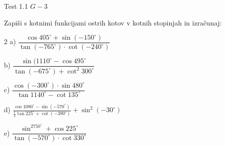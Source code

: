 \documentclass[a4paper,12pt]{letter}
\renewcommand{\headrulewidth}{3pt}
\renewcommand{\headrulewidth}{0.3pt}
\begin{document}
\pagestyle{fancy}
\renewcommand\headrulewidth{0pt}
\lhead{}\chead{}\rhead{}
\rfoot{\vspace*{-2\baselineskip}}


\renewcommand{\vec}{\overrightarrow}


\everymath{\displaystyle}
\begin{minipage}{20cm}
\begin{bclogo}[couleur=brown!30,
  arrondi=0,ombre=true, couleurOmbre=gray!50,
logo =\bcplume,
  noborder=true]
{\textrm{{\Large{Test 1.1} \Huge{}
\large{} \hfill $G-3$}}}
\end{bclogo}
\end{minipage}
\begin{minipage}{20cm}
\begin{bclogo}[couleur=brown!30,
  arrondi=0,ombre=true, couleurOmbre=gray!50,
logo =\bcplume,
  noborder=true]
{\textrm{{}}}
\end{bclogo}
\end{minipage}

\begin{naloga}
Zapiši s kotnimi funkcijami ostrih kotov v kotnih stopinjah in izračunaj:
\begin{multicols}{2}
a) $
\dfrac{\cos 405^\circ + \sin(-150^\circ)}{\tan(-765^\circ) \cdot \cot(-240^\circ)}$

b) $
\dfrac{\sin(1110^\circ - \cos495^\circ}{\tan(-675^\circ) + \cot^2 300^\circ}
$

c) $
\dfrac{\cos(-300^\circ) \cdot \sin480^\circ}{\tan1140^\circ - \cot135^\circ}
$

d) $
\frac{\cos1080^\circ - \sin(-570^\circ)}{\frac{1}{2}\tan225^\circ + \cot(-390^\circ)}+\sin^2(-30^{\circ})
$ 

e) $
\dfrac{\sin^2750^\circ + \cos225^\circ}{\tan(-570^\circ) \cdot \cot330^\circ}
$
\end{multicols}
\end{naloga}
\newpage
\end{document}
